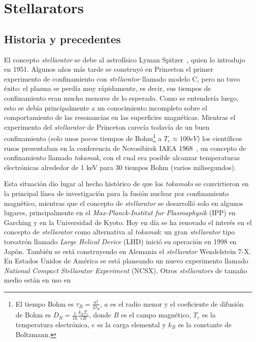 \chapter{Stellarators}\label{ch:cap2}
\section{Historia y precedentes}
El concepto \textit{stellarator} se debe al astrofísico Lyman Spitzer~\cite{doi:10.1063/1.1705883}, quien lo
introdujo en 1951. Algunos años más tarde se construyó en Princeton el primer experimento de confinamiento con \textit{stellarator} llamado modelo C, pero
no tuvo éxito: el plasma se perdía muy rápidamente, es decir, sus tiempos
de confinamiento eran mucho menores de lo esperado. Como se entendería
luego, esto se debía principalmente a un conocimiento incompleto sobre el
comportamiento de las resonancias en las superficies magnéticas. Mientras
el experimento del \textit{stellarator} de Princeton carecía todavía de un buen confinamiento (solo unos pocos tiempos de Bohm\footnote{El tiempo Bohm es $\tau_B=\frac{a^2}{D_B}$, $a$ es el radio menor y el coeficiente de difusión de Bohm es $D_B=\frac{1}{16}\frac{k_BT_e}{eB}$, donde $B$ es el campo magnético, $T_e$ es la temperatura electrónica, $e$ es la carga elemental y $k_B$ es la constante de Boltzmann.}
a $T_e\approx100 eV$) los científicos
rusos presentaban en la conferencia de Novosibirsk IAEA 1968~\cite{Artsimovich1969}, un concepto de confinamiento llamado \textit{tokamak}, con el cual era posible alcanzar
temperaturas electrónicas alrededor de 1 keV para 30 tiempos Bohm (varios
milisegundos).\par
Esta situación dio lugar al hecho histórico de que los \textit{tokamaks} se convirtieron en la principal línea de investigación para la fusión nuclear por
confinamiento magnético, mientras que el concepto de \textit{stellarator} se desarrolló solo en algunos lugares, principalmente en el \textit{Max-Planck-Institut fur
Plasmaphysik} (IPP) en Garching y en la Universidad de Kyoto. Hoy en día
se ha renovado el interés en el concepto de \textit{stellarator} como alternativa al
\textit{tokamak}: un gran \textit{stellarator} tipo torsatrón llamado \textit{Large Helical Device}
(LHD) inició su operación en 1998 en Japón. También se está construyendo
en Alemania el \textit{stellarator} Wendelstein 7-X. En Estados Unidos de América
se está planeando un nuevo experimento llamado \textit{National Compact Stellarator Experiment} (NCSX). Otros \textit{stellarators} de tamaño medio están en uso en

